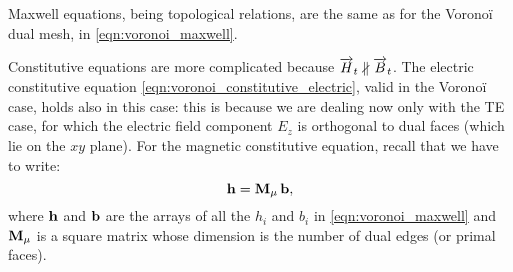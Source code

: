 Maxwell equations, being topological relations, are the same as for
the Vorono\"i dual mesh, in \eqref{eqn:voronoi_maxwell}.

Constitutive equations are more complicated because $\overrightarrow{H}_t \nparallel
\overrightarrow{B}_t$. The electric constitutive equation
\eqref{eqn:voronoi_constitutive_electric}, valid in the Vorono\"i
case, holds also in this case: this is because we are dealing now only
with the TE case, for which the electric field component $E_z$ is
orthogonal to dual faces (which lie on the $xy$ plane). For the
magnetic constitutive equation, recall that we have to write:
\begin{equation*}
  \mathbf{h} = {\mathbf{M}_\mu\,\mathbf{b}} ,
\end{equation*}
where $\mathbf{h}$ and $\mathbf{b}$ are the arrays of all the $h_i$ and
$b_i$ in \eqref{eqn:voronoi_maxwell} and $\mathbf{M}_\mu$ is a square
matrix whose dimension is the number of dual edges (or primal faces).

